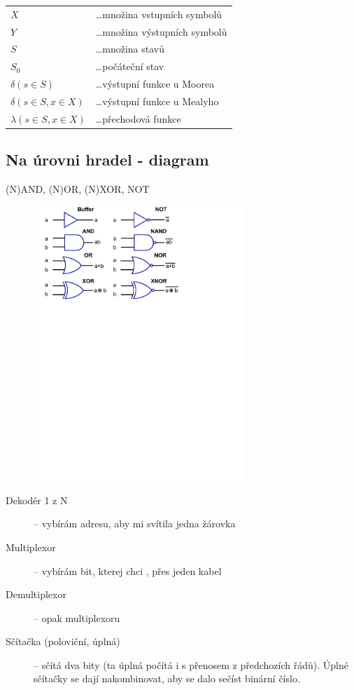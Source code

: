 \documentclass{szzclass}
\begin{document}
\begin{tabular}{l l}
$X$ & \dots množina vstupních symbolů \\
$Y$ & \dots množina výstupních symbolů \\
$S$ & \dots množina stavů \\
$S_0$ & \dots počáteční stav \\
$\delta(s\in S)$ & \dots výstupní funkce u Moorea\\
$\delta(s\in S,x\in X)$ & \dots výstupní funkce u Mealyho\\
$\lambda(s\in S,x\in X)$ & \dots přechodová funkce
\end{tabular}

\subsection{Na úrovni hradel - diagram}
(N)AND, (N)OR, (N)XOR, NOT

\begin{figure}[h]
\includegraphics[width=8cm]{topics/bi-spol-27/gates}
\end{figure}

\begin{description}
  \item [Dekodér 1 z N] -- vybírám adresu, aby mi svítila jedna žárovka
  \item [Multiplexor] -- vybírám bit, kterej chci , přes jeden kabel
  \item [Demultiplexor] -- opak multiplexoru
  \item [Sčítačka (poloviční, úplná)] -- sčítá dva bity (ta úplná počítá i s přenosem z předchozích řádů). Úplné sčítačky se dají nakombinovat, aby se dalo sečíst binární číslo.
\end{description}
\end{document}

